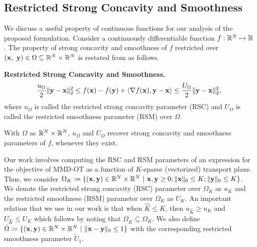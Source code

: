\subsection{Restricted Strong Concavity and Smoothness}\label{Prel:rsc} 
We discuss a useful property of continuous functions for our analysis of the proposed formulation. Consider a continuously differentiable function $f:\mathbb{R}^N \mapsto \mathbb{R}$. The property of strong concavity and smoothness of $f$ restricted over $(\bx, \ \by)\in\Omega\subseteq \R^N \times \R^N$ is restated from \citet[Definition 3.2]{prajain} as follows. 
\begin{definitionBox}\label{rsm-rsc}
\begin{definition}{\textbf{Restricted Strong Concavity and Smoothness.}}
$$\frac{u_\Omega}{2}\|\mathbf{y}-\mathbf{x}\|_2^2\leq f(\mathbf{x}) - f(\mathbf{y})+\langle\nabla f(\mathbf{x}), \mathbf{y}-\mathbf{x}\rangle \leq \frac{U_\Omega}{2}\|\mathbf{y}-\mathbf{x}\|_2^2,$$
where $u_\Omega$ is called the restricted strong concavity parameter (RSC) and $U_\Omega$ is called the restricted smoothness parameter (RSM) over $\Omega$.
\end{definition}
\end{definitionBox}
With $\Omega$ as $\mathbb{R}^N \times \mathbb{R}^N$, $u_\Omega$ and $U_\Omega$ recover strong concavity and smoothness parameters of $f$, whenever they exist.

Our work involves computing the RSC and RSM parameters of an expression for the objective of MMD-OT as a function of $K$-sparse (vectorized) transport plans.
Thus, we consider $\Omega_K \coloneqq \{ (\mathbf{x}, \mathbf{y})\in \mathbb{R}^N\times \mathbb{R}^N~|~ \mathbf{x}, \mathbf{y} \geq 0; \|\mathbf{x}\|_0 \leq K; \|\mathbf{y}\|_0 \leq K\}$. We denote the restricted strong concavity (RSC) parameter over $\Omega_K$ as $u_{K}$ and the restricted smoothness (RSM) parameter over $\Omega_K$ as $U_{K}$. An important relation that we use in our work is that when $\hat{K} \leq K$, then $u_{\hat{K}} \geq u_K$ and $U_{\hat{K}} \leq U_K$ which follows by noting that $\Omega_{\hat{K}} \subseteq \Omega_{K}$. We also define $\tilde{\Omega}\coloneqq  \{(\mathbf{x},\mathbf{y})\in \mathbb{R}^N\times \mathbb{R}^N~|~ \|\mathbf{x}-\mathbf{y}\|_0 \leq 1\}$  with the corresponding restricted smoothness parameter $\tilde{U}_1$.

